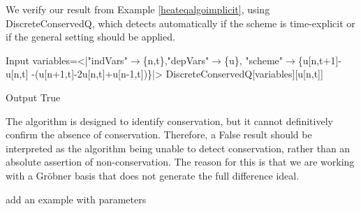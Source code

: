 \documentclass[runningheads]{llncs}
\newcommand{\1}{\chi}
\begin{document}
\begin{example}
	We verify our result from Example \ref{heateqalgoimplicit}, using {\sc DiscreteConservedQ}, which detects automatically if the scheme is time-explicit or if
	 the general setting should be applied.
	
	\begin{small}
		\begin{mmaCell}[moredefined={variables, expression, DiscreteConservedQ}]{Input}
  variables=<|"indVars"\(\pmb{\to}\)\{n,t\},"depVars"\(\pmb{\to}\)\{u\},
  "scheme"\(\pmb{\to}\)\{u[n,t+1]-u[n,t]
  -(u[n+1,t]-2u[n,t]+u[n-1,t])\}|>
  DiscreteConservedQ[variables][u[n,t]]
  
\end{mmaCell}
		\begin{mmaCell}{Output}
  True
\end{mmaCell}
	\end{small}
\end{example}
\begin{remark}\label{remark}
The algorithm is designed to identify conservation, but it cannot definitively confirm the absence of conservation. Therefore, a {\sc False} result should be interpreted as the algorithm being unable to detect conservation, rather than an absolute assertion of non-conservation. The reason for this is that we are working with a Gr\"obner basis that does not generate the full difference ideal. 
\end{remark}

{\color{red} add an example with parameters}
\end{document}
